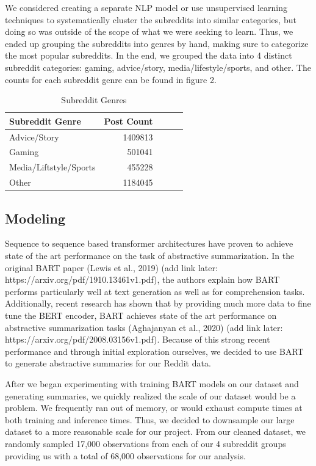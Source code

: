 \documentclass[11pt,a4paper, twocolumn]{article}
\begin{document}
We considered creating a separate NLP model or use unsupervised learning techniques to systematically cluster the subreddits into similar categories, 
but doing so was outside of the scope of what we were seeking to learn. 
Thus, we ended up grouping the subreddits into genres by hand, making sure to categorize the most popular subreddits. 
In the end, we grouped the data into 4 distinct subreddit categories: gaming, advice/story, media/lifestyle/sports, and other. 
The counts for each subreddit genre can be found in figure 2. 

\begin{table}
  \centering
  \begin{tabular}{lrlll}
  \hline \textbf{Subreddit Genre} & \textbf{Post Count}\\ \hline
  Advice/Story & 1409813 \\
  Gaming & 501041 \\
  Media/Liftstyle/Sports & 455228 \\
  Other & 1184045 \\
  \hline
  \end{tabular}
  \caption{\label{font-table} Subreddit Genres}
\end{table}


\subsection{Modeling}

Sequence to sequence based transformer architectures have proven to achieve state of the art performance on the task of abstractive summarization.
In the original BART paper  (Lewis et al., 2019) (add link later: https://arxiv.org/pdf/1910.13461v1.pdf), the authors explain how BART performs 
particularly well at text generation as well as for comprehension tasks. Additionally, recent research has shown that by providing 
much more data to fine tune the BERT encoder, BART achieves state of the art performance on abstractive summarization tasks (Aghajanyan et al., 2020) (add link later: https://arxiv.org/pdf/2008.03156v1.pdf). 
Because of this strong recent performance and through initial exploration ourselves, we decided to use BART to 
generate abstractive summaries for our Reddit data. 

After we began experimenting with training BART models on our dataset and generating summaries, we quickly realized the scale of our dataset would be a problem. 
We frequently ran out of memory, or would exhaust compute times at both training and inference times. 
Thus, we decided to downsample our large dataset to a more reasonable scale for our project. 
From our cleaned dataset, we randomly sampled 17,000 observations from each of our 4 subreddit groups providing us with a total of 68,000 observations for our analysis. 
\end{document}

